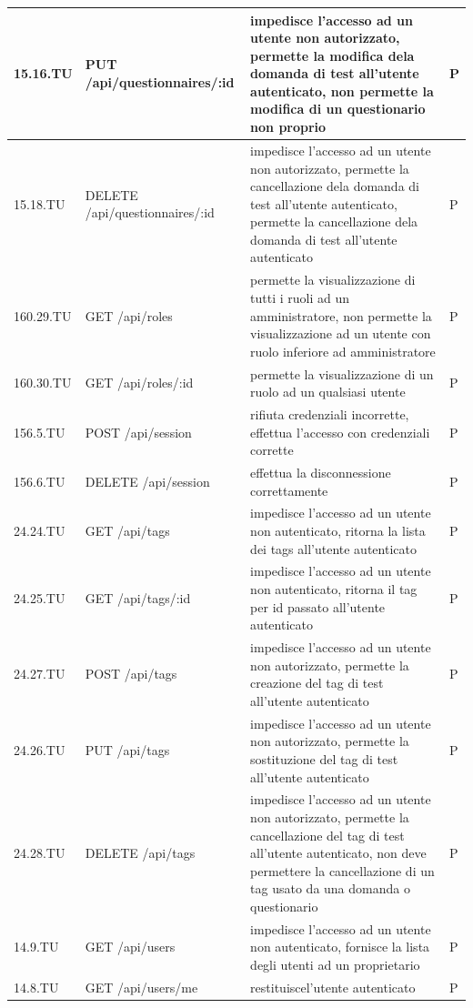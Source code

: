 \documentclass[12pt,a4paper]{article}
\begin{document}
\begin{center}
\begin{longtable}[]{p{} p{} p{} p{}}
			15.16.TU &  PUT /api/questionnaires/:id & impedisce l'accesso ad un utente non autorizzato, permette la modifica dela domanda di test all'utente autenticato, non permette la modifica di un questionario non proprio & P \\ \midrule
			15.18.TU &  DELETE /api/questionnaires/:id & impedisce l'accesso ad un utente non autorizzato, permette la cancellazione dela domanda di test all'utente autenticato, permette la cancellazione dela domanda di test all'utente autenticato & P \\ \midrule
			160.29.TU &  GET /api/roles & permette la visualizzazione di tutti i ruoli ad un amministratore, non permette la visualizzazione ad un utente con ruolo inferiore ad amministratore & P \\ \midrule
			160.30.TU &  GET /api/roles/:id & permette la visualizzazione di un ruolo ad un qualsiasi utente & P \\ \midrule
			156.5.TU &  POST /api/session & rifiuta credenziali incorrette, effettua l'accesso con credenziali corrette & P \\ \midrule
			156.6.TU &  DELETE /api/session & effettua la disconnessione correttamente & P \\ \midrule
			24.24.TU &  GET /api/tags & impedisce l'accesso ad un utente non autenticato, ritorna la lista dei tags all'utente autenticato & P \\ \midrule
			24.25.TU &  GET /api/tags/:id & impedisce l'accesso ad un utente non autenticato, ritorna il tag per id passato all'utente autenticato & P \\ \midrule
			24.27.TU &  POST /api/tags & impedisce l'accesso ad un utente non autorizzato, permette la creazione del tag di test all'utente autenticato & P \\ \midrule
			24.26.TU &  PUT /api/tags & impedisce l'accesso ad un utente non autorizzato, permette la sostituzione del tag di test all'utente autenticato & P \\ \midrule
			24.28.TU &  DELETE /api/tags & impedisce l'accesso ad un utente non autorizzato, permette la cancellazione del tag di test all'utente autenticato, non deve permettere la cancellazione di un tag usato da una domanda o questionario & P \\ \midrule
			14.9.TU &  GET /api/users & impedisce l'accesso ad un utente non autenticato, fornisce la lista degli utenti ad un proprietario & P \\ \midrule
			14.8.TU &  GET /api/users/me & restituiscel'utente autenticato & P \\ \midrule

\end{longtable}
\end{center}
\end{document}

